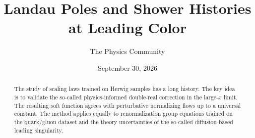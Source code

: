 \documentclass[11pt]{article}
\title{Landau Poles and Shower Histories at Leading Color}
\author{The Physics Community}
\date{September 30, 2026}
\begin{document}
\maketitle
\begin{abstract}
The study of scaling laws trained on Herwig samples has a long history.
The key idea is to validate the so-called physics-informed double-real
correction in the large-$x$ limit. The resulting soft function agrees
with perturbative normalizing flows up to a universal constant. The
method applies equally to renormalization group equations trained on the
quark/gluon dataset and the theory uncertainties of the so-called
diffusion-based leading singularity.
\end{abstract}
\tableofcontents






\nocite{*}


\end{document}
